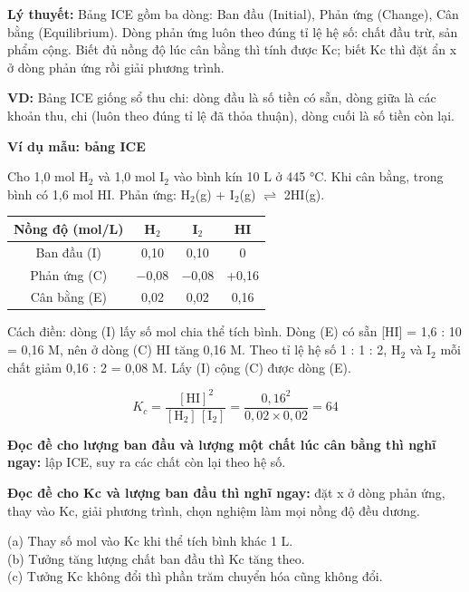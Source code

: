 \textbf{Lý thuyết:} Bảng ICE gồm ba dòng: Ban đầu (Initial), Phản ứng (Change), Cân bằng (Equilibrium). Dòng phản ứng luôn theo đúng tỉ lệ hệ số: chất đầu trừ, sản phẩm cộng. Biết đủ nồng độ lúc cân bằng thì tính được Kc; biết Kc thì đặt ẩn x ở dòng phản ứng rồi giải phương trình.

\textbf{VD:} Bảng ICE giống sổ thu chi: dòng đầu là số tiền có sẵn, dòng giữa là các khoản thu, chi (luôn theo đúng tỉ lệ đã thỏa thuận), dòng cuối là số tiền còn lại.

\Needspace{11cm}
\begin{keybox}{\color{primaryBlue}\textbf{Ví dụ mẫu: bảng ICE}}\par
Cho 1,0 mol H$_{2}$ và 1,0 mol I$_{2}$ vào bình kín 10 L ở 445 °C. Khi cân bằng, trong bình có 1,6 mol HI. Phản ứng: H$_{2}$(g) + I$_{2}$(g) $\rightleftharpoons$ 2HI(g).

\Needspace{5cm}
{\small
\begin{center}
\renewcommand{\arraystretch}{1.3}
\begin{tabular}{|c|c|c|c|}
\hline
\rowcolor{pastelBlue}
\textbf{Nồng độ (mol/L)} & \textbf{H$_{2}$} & \textbf{I$_{2}$} & \textbf{HI} \\
\hline
Ban đầu (I) & 0,10 & 0,10 & 0 \\
\hline
Phản ứng (C) & $-$0,08 & $-$0,08 & +0,16 \\
\hline
Cân bằng (E) & 0,02 & 0,02 & 0,16 \\
\hline
\end{tabular}
\end{center}
}
Cách điền: dòng (I) lấy số mol chia thể tích bình. Dòng (E) có sẵn [HI] = 1,6 : 10 = 0,16 M, nên ở dòng (C) HI tăng 0,16 M. Theo tỉ lệ hệ số 1 : 1 : 2, H$_{2}$ và I$_{2}$ mỗi chất giảm 0,16 : 2 = 0,08 M. Lấy (I) cộng (C) được dòng (E).

\[ K_c = \dfrac{[\mathrm{HI}]^2}{[\mathrm{H_2}]\,[\mathrm{I_2}]} = \dfrac{0{,}16^2}{0{,}02 \times 0{,}02} = 64 \]
\end{keybox}
\begin{reflexbox}
\item \textbf{Đọc đề cho lượng ban đầu và lượng một chất lúc cân bằng thì nghĩ ngay:} lập ICE, suy ra các chất còn lại theo hệ số.
\item \textbf{Đọc đề cho Kc và lượng ban đầu thì nghĩ ngay:} đặt x ở dòng phản ứng, thay vào Kc, giải phương trình, chọn nghiệm làm mọi nồng độ đều dương.
\end{reflexbox}
\begin{trapbox}(a) Thay số mol vào Kc khi thể tích bình khác 1 L.\\ (b) Tưởng tăng lượng chất ban đầu thì Kc tăng theo.\\ (c) Tưởng Kc không đổi thì phần trăm chuyển hóa cũng không đổi.\end{trapbox}
